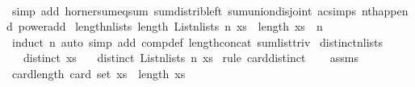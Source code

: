 \begin{isabellebody}
\ \ \isamarkupfalse%
\ {\isacharparenleft}{\kern0pt}simp\ add{\isacharcolon}{\kern0pt}\ horner{\isacharunderscore}{\kern0pt}sum{\isacharunderscore}{\kern0pt}eq{\isacharunderscore}{\kern0pt}sum\ sum{\isacharunderscore}{\kern0pt}distrib{\isacharunderscore}{\kern0pt}left\ sum{\isachardot}{\kern0pt}union{\isacharunderscore}{\kern0pt}disjoint\ ac{\isacharunderscore}{\kern0pt}simps\ nth{\isacharunderscore}{\kern0pt}append\ power{\isacharunderscore}{\kern0pt}add{\isacharparenright}{\kern0pt}%
\endisatagproof
{\isafoldproof}%
%
\isadelimproof
\isanewline
%
\endisadelimproof
\isanewline
{}\isamarkupfalse%
%
\isadelimdocument
%
\endisadelimdocument
%
\isatagdocument
%
\isamarkuptrue%
%
\endisatagdocument
{\isafolddocument}%
%
\isadelimdocument
%
\endisadelimdocument
{}\isamarkupfalse%
\ length{\isacharunderscore}{\kern0pt}n{\isacharunderscore}{\kern0pt}lists{\isacharcolon}{\kern0pt}\ {\isachardoublequoteopen}length\ {\isacharparenleft}{\kern0pt}List{\isachardot}{\kern0pt}n{\isacharunderscore}{\kern0pt}lists\ n\ xs{\isacharparenright}{\kern0pt}\ {\isacharequal}{\kern0pt}\ length\ xs\ {\isacharcircum}{\kern0pt}\ n{\isachardoublequoteclose}\isanewline
%
\isadelimproof
\ \ %
\endisadelimproof
%
\isatagproof
{}\isamarkupfalse%
\ {\isacharparenleft}{\kern0pt}induct\ n{\isacharparenright}{\kern0pt}\ {\isacharparenleft}{\kern0pt}auto\ simp\ add{\isacharcolon}{\kern0pt}\ comp{\isacharunderscore}{\kern0pt}def\ length{\isacharunderscore}{\kern0pt}concat\ sum{\isacharunderscore}{\kern0pt}list{\isacharunderscore}{\kern0pt}triv{\isacharparenright}{\kern0pt}%
\endisatagproof
{\isafoldproof}%
%
\isadelimproof
\isanewline
%
\endisadelimproof
\isanewline
{}\isamarkupfalse%
\ distinct{\isacharunderscore}{\kern0pt}n{\isacharunderscore}{\kern0pt}lists{\isacharcolon}{\kern0pt}\isanewline
\ \ \ {\isachardoublequoteopen}distinct\ xs{\isachardoublequoteclose}\isanewline
\ \ \ {\isachardoublequoteopen}distinct\ {\isacharparenleft}{\kern0pt}List{\isachardot}{\kern0pt}n{\isacharunderscore}{\kern0pt}lists\ n\ xs{\isacharparenright}{\kern0pt}{\isachardoublequoteclose}\isanewline
%
\isadelimproof
%
\endisadelimproof
%
\isatagproof
{}\isamarkupfalse%
\ {\isacharparenleft}{\kern0pt}rule\ card{\isacharunderscore}{\kern0pt}distinct{\isacharparenright}{\kern0pt}\isanewline
\ \ \isamarkupfalse%
\ assms\ \isamarkupfalse%
\ card{\isacharunderscore}{\kern0pt}length{\isacharcolon}{\kern0pt}\ {\isachardoublequoteopen}card\ {\isacharparenleft}{\kern0pt}set\ xs{\isacharparenright}{\kern0pt}\ {\isacharequal}{\kern0pt}\ length\ xs{\isachardoublequoteclose}\ \isamarkupfalse%

\end{isabellebody}
